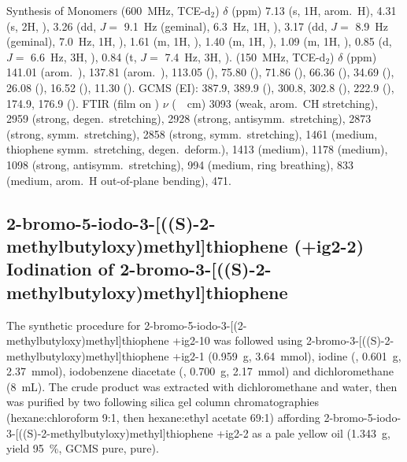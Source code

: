 \begin{section}{Synthesis of Monomers}
{\HNMR} (\SI{600}{\MHz}, \gls{TCE}-d$_2$) $\delta$ (ppm) 7.13 (s, 1H, arom.\ H), 4.31 (s, 2H, ), 3.26 (dd, $J =$ \SI{9.1}{\Hz} (geminal), \SI{6.3}{\Hz}, 1H, ), 3.17 (dd, $J =$ \SI{8.9}{\Hz} (geminal), \SI{7.0}{\Hz}, 1H, ), 1.61 (m, 1H, ), 1.40 (m, 1H, ), 1.09 (m, 1H, ), 0.85 (d, $J =$ \SI{6.6}{\Hz}, 3H, ), 0.84 (t, $J =$ \SI{7.4}{\Hz}, 3H, ).
{\CNMR} (\SI{150}{\MHz}, \gls{TCE}-d$_2$) $\delta$ (ppm) 141.01 (arom.\ ), 137.81 (arom.\ ), 113.05 (), 75.80 (), 71.86 (), 66.36 (), 34.69 (), 26.08 (), 16.52 (), 11.30 ().
\gls{GCMS} (EI): 387.9, 389.9 (), 300.8, 302.8 (), 222.9 (), 174.9, 176.9 ().
\gls{FTIR} (film on ) $\nu$ (\SI{}{\per\cm}) 3093 (weak, arom.\ CH stretching), 2959 (strong,  degen.\ stretching), 2928 (strong,  antisymm.\ stretching), 2873 (strong,  symm.\ stretching), 2858 (strong,  symm.\ stretching), 1461 (medium,  thiophene symm.\ stretching,  degen.\ deform.), 1413 (medium), 1178 (medium), 1098 (strong,  antisymm.\ stretching), 994 (medium, ring breathing), 833 (medium, arom.\ H out-of-plane bending), 471.

\subsection[2-bromo-5-iodo-3-[((S)-2-methyl\-butyl\-oxy)\-methyl{]}\-thio\-phene (\cmpd+{ig2-2})]{2-bromo-5-iodo-3-[((S)-2-methyl\-butyl\-oxy)\-methyl{]}\-thio\-phene (\cmpd+{ig2-2}) \\ Iodination of 2-bromo-3-[((S)-2-methyl\-butyl\-oxy)\-methyl{]}\-thio\-phene}
\label{sec:ig2-2}
The synthetic procedure for 2-bromo-5-iodo-3-[(2-methyl\-butyl\-oxy)\-methyl{]}\-thio\-phene \cmpd+{ig2-10} was followed using 2-bromo-3-[((S)-2-methyl\-butyl\-oxy)\-methyl{]}\-thio\-phene \cmpd+{ig2-1} (\SI{0.959}{\g}, \SI{3.64}{\mmol}), iodine (, \SI{0.601}{\g}, \SI{2.37}{\mmol}), iodo\-benzene di\-acetate (, \SI{0.700}{\g}, \SI{2.17}{\mmol}) and dichloromethane (\SI{8}{\mL}). 
The crude product was extracted with dichloromethane and water, then was purified by two following silica gel column chromatographies (hexane:\-chloro\-form 9:1, then hexane:\-ethyl acetate 69:1) affording 2-bromo-5-iodo-3-[((S)-2-methyl\-butyl\-oxy)\-methyl{]}\-thio\-phene \cmpd+{ig2-2} as a pale yellow oil (\SI{1.343}{\g}, yield 95~\%, \gls{GCMS} pure, {\HNMR} pure).


\end{section}
